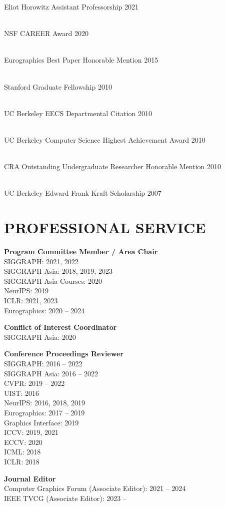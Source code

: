 \documentclass[line,margin]{res}
\begin{document}
\begin{resume}
\newcommand{\award}[2] {
	#1 \hfill #2
}

\award
{Eliot Horowitz Assistant Professorship}
{2021}
\\
\award
{NSF CAREER Award}
{2020}
\\
\award
{Eurographics Best Paper Honorable Mention}
{2015}
\\
\award
{Stanford Graduate Fellowship}
{2010}
\\
\award
{UC Berkeley EECS Departmental Citation}
{2010}
\\
\award
{UC Berkeley Computer Science Highest Achievement Award}
{2010}
\\
\award
{CRA Outstanding Undergraduate Researcher Honorable Mention}
{2010}
\\
\award
{UC Berkeley Edward Frank Kraft Scholarship}
{2007}


\section{PROFESSIONAL SERVICE}

\textbf{Program Committee Member / Area Chair}\\
SIGGRAPH: 2021, 2022\\
SIGGRAPH Asia: 2018, 2019, 2023\\
SIGGRAPH Asia Courses: 2020\\
NeurIPS: 2019\\
ICLR: 2021, 2023\\
Eurographics: 2020 -- 2024

\textbf{Conflict of Interest Coordinator}\\
SIGGRAPH Asia: 2020

\textbf{Conference Proceedings Reviewer}\\
SIGGRAPH: 2016 -- 2022\\
SIGGRAPH Asia: 2016 -- 2022\\
CVPR: 2019 -- 2022\\
UIST: 2016\\
NeurIPS: 2016, 2018, 2019\\
Eurographics: 2017 --  2019\\
Graphics Interface: 2019\\
ICCV: 2019, 2021\\
ECCV: 2020\\
ICML: 2018\\
ICLR: 2018

\textbf{Journal Editor}\\
Computer Graphics Forum (Associate Editor): 2021 -- 2024\\
IEEE TVCG (Associate Editor): 2023 --


\end{resume}
\end{document}

